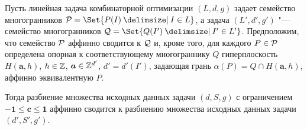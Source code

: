 \begin{theorem}
\label{thm:Aff2Cones}
Пусть линейная задача комбинаторной оптимизации $(L,d,g)$ задает семейство многогранников $\Pf = \Set{P(I)\given I\in L}$, а задача $(L',d',g')$ "--- семейство многогранников $\Qf = \Set{Q(I')\given I'\in L'}$.
Предположим, что семейство ${\mathcal P}$ аффинно сводится к ${\mathcal Q}$ и, кроме того, для каждого $P \in {\mathcal P}$ определена опорная к соответствующему многограннику $Q$ гиперплоскость
\(H(\bm{a}, h)\), $h \in \mathbb{Z}$, $\bm{a} \in \mathbb{Z}^{d'}$, $d' = d'(I')$, задающая грань $\alpha(P) = Q \cap H(\bm{a}, h)$, аффинно эквивалентную $P$.

Тогда разбиение множества исходных данных задачи $(d,S,g)$ с ограничением $\bm{-1} \le \bm{c} \le \bm{1}$ аффинно сводится к разбиению множества исходных данных задачи $(d',S',g')$.
\end{theorem}

